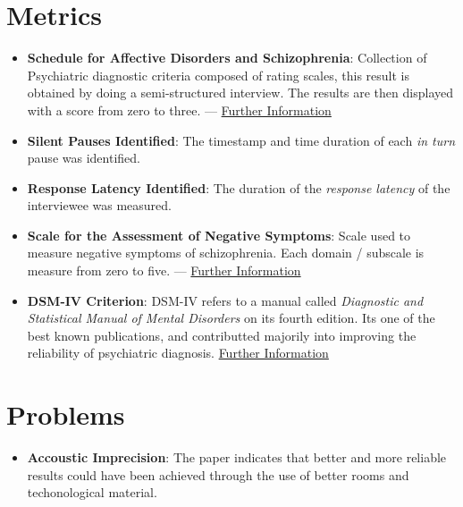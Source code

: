 \documentclass{Paper_Summary}
\begin{document}
\section{Metrics}
    \begin{itemize}
        \item \textbf{Schedule for Affective Disorders and Schizophrenia}: Collection of Psychiatric diagnostic criteria composed of rating scales, this result is obtained by doing a semi-structured interview. The results are then displayed with a score from zero to three. — \href{https://en.wikipedia.org/wiki/Schedule_for_Affective_Disorders_and_Schizophrenia}{Further Information}
        \item \textbf{Silent Pauses Identified}: The timestamp and time duration of each \emph{in turn} pause was identified.
        \item \textbf{Response Latency Identified}: The duration of the \emph{response latency} of the interviewee was measured.
        \item \textbf{Scale for the Assessment of Negative Symptoms}: Scale used to measure negative symptoms of schizophrenia. Each domain / subscale is measure from zero to five. — \href{https://en.wikipedia.org/wiki/Scale_for_the_Assessment_of_Negative_Symptoms}{Further Information}
        \item \textbf{DSM-IV Criterion}: DSM-IV refers to a manual called \emph{Diagnostic and Statistical Manual of Mental Disorders} on its fourth edition. Its one of the best known publications, and contributted majorily into improving the reliability of psychiatric diagnosis. \href{https://en.wikipedia.org/wiki/Diagnostic_and_Statistical_Manual_of_Mental_Disorders#DSM-IV_(1994)}{Further Information}
    \end{itemize}

\section{Problems}
    \begin{itemize}
        \item \textbf{Accoustic Imprecision}: The paper indicates that better and more reliable results could have been achieved through the use of better rooms and techonological material.
    \end{itemize}
\end{document}

